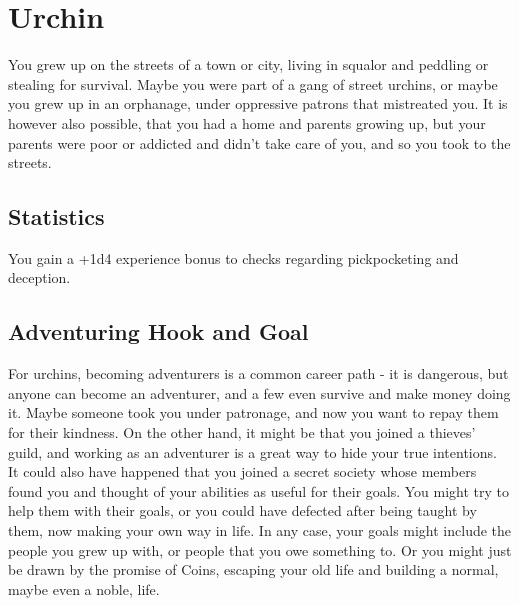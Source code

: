 \section{Urchin}\label{background:urchin}
You grew up on the streets of a town or city, living in squalor and peddling or stealing for survival.
Maybe you were part of a gang of street urchins, or maybe you grew up in an orphanage, under oppressive patrons that mistreated you.
It is however also possible, that you had a home and parents growing up, but your parents were poor or addicted and didn't take care of you, and so you took to the streets.

\subsection{Statistics}
You gain a +1d4 experience bonus to checks regarding pickpocketing and deception.

\subsection{Adventuring Hook and Goal}
For urchins, becoming adventurers is a common career path - it is dangerous, but anyone can become an adventurer, and a few even survive and make money doing it.
Maybe someone took you under patronage, and now you want to repay them for their kindness.
On the other hand, it might be that you joined a thieves' guild, and working as an adventurer is a great way to hide your true intentions.
It could also have happened that you joined a secret society whose members found you and thought of your abilities as useful for their goals.
You might try to help them with their goals, or you could have defected after being taught by them, now making your own way in life.
In any case, your goals might include the people you grew up with, or people that you owe something to.
Or you might just be drawn by the promise of Coins, escaping your old life and building a normal, maybe even a noble, life.
